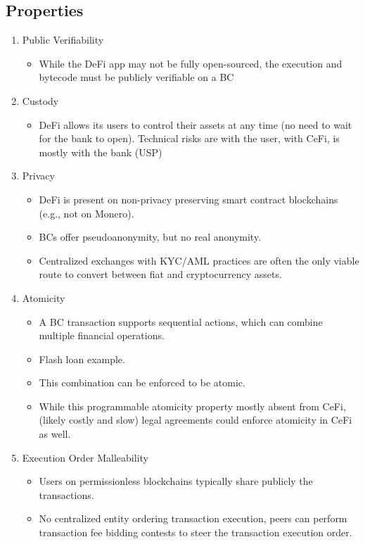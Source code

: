 \subsection{Properties}
\begin{enumerate}
  \item Public Verifiability
  \begin{itemize}
    \item While the DeFi app may not be fully open-sourced, the execution and bytecode must be publicly verifiable on a BC
  \end{itemize}
  \item Custody
  \begin{itemize}
    \item DeFi allows its users to control their assets at any time (no need to wait for the bank to open). Technical risks are with the user, with CeFi, is mostly with the bank (USP)
  \end{itemize}
  \item Privacy
  \begin{itemize}
    \item DeFi is present on non-privacy preserving smart contract blockchains (e.g., not on Monero).
    \item BCs offer pseudoanonymity, but no real anonymity.
    \item Centralized exchanges with KYC/AML practices are often the only viable route to convert between fiat and cryptocurrency assets.
  \end{itemize}
  \item Atomicity
  \begin{itemize}
    \item A BC transaction supports sequential actions, which can combine multiple financial operations.
    \item Flash loan example.
    \item This combination can be enforced to be atomic.
    \item While this programmable atomicity property mostly absent from CeFi, (likely costly and slow) legal agreements could enforce atomicity in CeFi as well.
  \end{itemize}
  \item Execution Order Malleability
  \begin{itemize}
    \item Users on permissionless blockchains typically share publicly the transactions.
    \item No centralized entity ordering transaction execution, peers can perform transaction fee bidding contests to steer the transaction execution order.

\end{itemize}
\end{enumerate}
